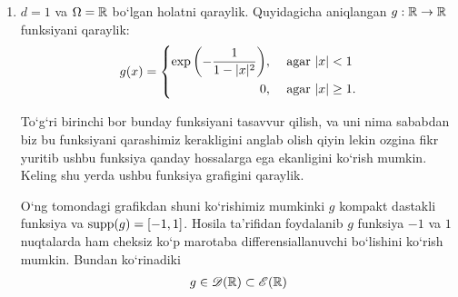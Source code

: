 \begin{example}
    \begin{enumerate}
        \item $d=1$ va $\Omega=\mathbb{R}$ bo`lgan holatni qaraylik. Quyidagicha aniq\-lan\-gan $g:\mathbb{R}\rightarrow \mathbb{R}$ funksiyani qaraylik:
    \begin{equation}
            g(x)=\left\{\begin{aligned}
                \exp\left(-\frac{1}{1-\lvert x\rvert^2}\right)&, & \textnormal{ agar } & \lvert x\rvert <1 \\
                 0 &, & \textnormal{ agar } & \lvert x\rvert \ge 1.
            \end{aligned}\right. 
    \end{equation}

    To`g`ri birinchi bor bunday funksiyani tasavvur qilish, va uni nima sa\-bab\-dan biz bu funksiyani qarashimiz kerakligini anglab olish qiyin lekin ozgina fikr yu\-ri\-tib ushbu funksiya qanday hossalarga ega ekanligini ko`rish mumkin. Keling shu yer\-da ushbu funksiya grafigini qaraylik.

    \noindent
    \begin{minipage}{0.9\textwidth}
    \begin{minipage}[b]{0.5\textwidth}
    O`ng tomondagi grafikdan shuni ko`\-ri\-shi\-miz mumkinki $g$ kom\-pakt das\-tak\-li funksiya va $\operatorname{supp}(g)=[-1,1]$. Hosila ta'rifidan foydalanib $g$ funk\-si\-ya $-1$ va $1$ nuq\-ta\-lar\-da ham cheksiz ko`p ma\-ro\-ta\-ba dif\-fe\-ren\-si\-al\-la\-nuv\-chi bo`\-li\-shi\-ni ko`rish mumkin. Bundan ko`rinadiki 
    \begin{align*} 
        g\in \mathscr{D}(\mathbb{R})\subset\mathscr{E}(\mathbb{R})
    \end{align*}
    \end{minipage}
    \hspace{0.02\textwidth}
    \begin{minipage}[b]{0.45\textwidth}
        \begin{figure}[H]
            \centering
            \label{fig:convkernel}
        

\end{figure}
\end{minipage}
\end{minipage}
\end{enumerate}
\end{example}
